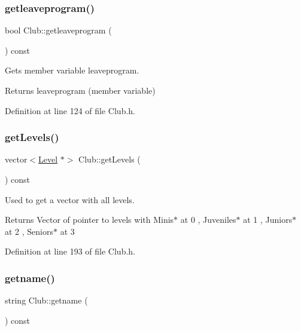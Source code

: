 \subsubsection{\texorpdfstring{getleaveprogram()}{getleaveprogram()}}
{\footnotesize\ttfamily bool Club\+::getleaveprogram (\begin{DoxyParamCaption}{ }\end{DoxyParamCaption}) const\hspace{0.3cm}{\ttfamily [inline]}}



Gets member variable leaveprogram. 

\begin{DoxyReturn}{Returns}
leaveprogram (member variable) 
\end{DoxyReturn}


Definition at line 124 of file Club.\+h.

\hypertarget{class_club_ad196e0999b3c18c1ed3e757ccf70b92d}{}\label{class_club_ad196e0999b3c18c1ed3e757ccf70b92d} 
\subsubsection{\texorpdfstring{get\+Levels()}{getLevels()}}
{\footnotesize\ttfamily vector$<$\hyperlink{class_level}{Level} $\ast$$>$ Club\+::get\+Levels (\begin{DoxyParamCaption}{ }\end{DoxyParamCaption}) const\hspace{0.3cm}{\ttfamily [inline]}}



Used to get a vector with all levels. 

\begin{DoxyReturn}{Returns}
Vector of pointer to levels with Minis$\ast$ at 0 , Juveniles$\ast$ at 1 , Juniors$\ast$ at 2 , Seniors$\ast$ at 3 
\end{DoxyReturn}


Definition at line 193 of file Club.\+h.

\hypertarget{class_club_aca473ab431cc852ad0f99479aace788c}{}\label{class_club_aca473ab431cc852ad0f99479aace788c} 
\subsubsection{\texorpdfstring{getname()}{getname()}}
{\footnotesize\ttfamily string Club\+::getname (\begin{DoxyParamCaption}{ }\end{DoxyParamCaption}) const\hspace{0.3cm}{\ttfamily [inline]}}



